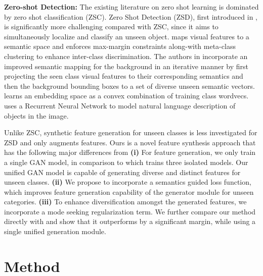 \documentclass[runningheads]{llncs}
\begin{document}
\noindent\textbf{Zero-shot Detection:}
The existing literature on zero shot learning is dominated by zero shot classification (ZSC). Zero Shot Detection (ZSD), first introduced in \cite{rahman2018zero,bansal2018zero}, is significantly more challenging compared with ZSC, since it aims to simultaneously localize and classify an unseen object. \cite{rahman2018zero} maps visual features to a semantic space and enforces max-margin constraints along-with meta-class clustering to enhance inter-class discrimination. The authors in \cite{bansal2018zero} incorporate an improved semantic mapping for the background in an iterative manner by first projecting the seen class visual features to their corresponding semantics and then the background bounding boxes to a set of diverse unseen semantic vectors. \cite{demirel2018zero} learns an embedding space as a convex combination of training class wordvecs. \cite{li2019zero} uses a Recurrent Neural Network to model natural language description of objects in the image. 






Unlike ZSC, synthetic feature generation for unseen classes is less investigated for ZSD and only \cite{zhao2020gtnet} augments features. Ours is a novel feature synthesis approach that has the following major differences from \cite{zhao2020gtnet} \textbf{(i)} For feature generation, we only train a single GAN model, in comparison to \cite{zhao2020gtnet} which trains three isolated models. Our unified GAN model is capable of generating diverse and distinct features for unseen classes. \textbf{(ii)} We propose to incorporate a semantics guided loss function, which improves feature generation capability of the generator module for unseen categories. \textbf{(iii)} To enhance diversification amongst the generated features, we incorporate a mode seeking regularization term. We further compare our method directly with \cite{zhao2020gtnet} and show that it outperforms \cite{zhao2020gtnet} by a significant margin, while using a single unified generation module.






\section{Method}
\end{document}
